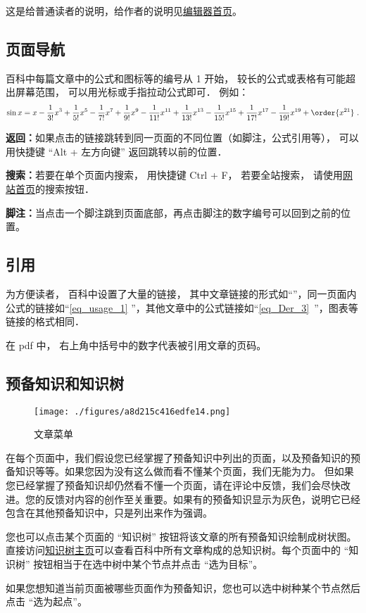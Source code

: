 
这是给普通读者的说明，给作者的说明见\href{https://wuli.wiki/editor}{编辑器首页}。

\subsection{页面导航}
百科中每篇文章中的公式和图标等的编号从 1 开始， 较长的公式或表格有可能超出屏幕范围， 可以用光标或手指拉动公式即可． 例如：
\begin{equation}\label{eq_usage_1}
\sin x = x - \frac{1}{3!} x^3 + \frac{1}{5!} x^5 - \frac{1}{7!} x^7+\frac{1}{9!} x^9-\frac{1}{11!} x^{11}+\frac{1}{13!} x^{13}-\frac{1}{15!} x^{15}+\frac{1}{17!} x^{17}-\frac{1}{19!} x^{19}+ \order{x^{21}}~.
\end{equation}

\textbf{返回：}如果点击的链接跳转到同一页面的不同位置（如脚注，公式引用等）， 可以用快捷键 “Alt + 左方向键” 返回跳转以前的位置．

\textbf{搜索：}若要在单个页面内搜索， 用快捷键 Ctrl + F， 若要全站搜索， 请使用\href{https://wuli.wiki}{网站首页}的搜索按钮．

\textbf{脚注：}当点击一个脚注跳到页面底部，再点击脚注的数字编号可以回到之前的位置。

\subsection{引用}
为方便读者， 百科中设置了大量的链接， 其中文章链接的形式如“”，同一页面内公式的链接如“\autoref{eq_usage_1} ”，其他文章中的公式链接如“\autoref{eq_Der_3}~”，图表等链接的格式相同．

在 pdf 中， 右上角中括号中的数字代表被引用文章的页码。

\subsection{预备知识和知识树}
\begin{figure}[ht]
\centering
\texttt{[image: ./figures/a8d215c416edfe14.png]}
\caption{文章菜单} \label{fig_usage_2}
\end{figure}

在每个页面中，我们假设您已经掌握了预备知识中列出的页面，以及预备知识的预备知识等等。如果您因为没有这么做而看不懂某个页面，我们无能为力。 但如果您已经掌握了预备知识却仍然看不懂一个页面，请在评论中反馈，我们会尽快改进。您的反馈对内容的创作至关重要。如果有的预备知识显示为灰色，说明它已经包含在其他预备知识中，只是列出来作为强调。

您也可以点击某个页面的 “知识树” 按钮将该文章的所有预备知识绘制成树状图。 直接访问\href{https://wuli.wiki/tree/}{知识树主页}可以查看百科中所有文章构成的总知识树。每个页面中的 “知识树” 按钮相当于在选中树中某个节点并点击 “选为目标”。

如果您想知道当前页面被哪些页面作为预备知识，您也可以选中树种某个节点然后点击 “选为起点”。

